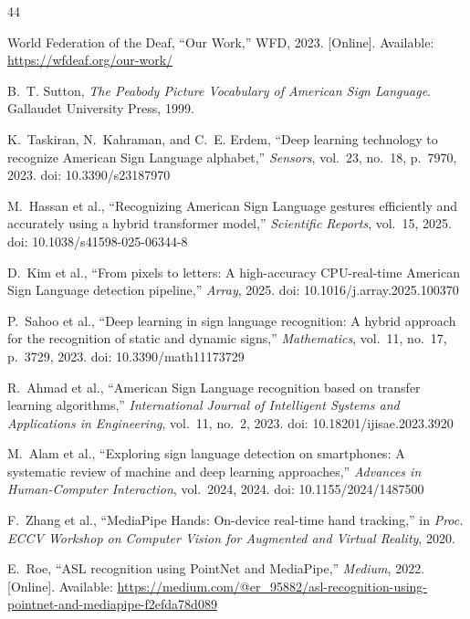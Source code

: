\documentclass[conference]{IEEEtran}
\begin{document}
\begin{thebibliography}{44}

World Federation of the Deaf, ``Our Work,'' WFD, 2023. [Online]. Available:
\url{https://wfdeaf.org/our-work/}

B.~T. Sutton, \textit{The Peabody Picture Vocabulary of American Sign Language}.
Gallaudet University Press, 1999.

K.~Taskiran, N.~Kahraman, and C.~E. Erdem, ``Deep learning technology to
recognize American Sign Language alphabet,'' \textit{Sensors}, vol.~23,
no.~18, p.~7970, 2023. doi: 10.3390/s23187970

M.~Hassan et al., ``Recognizing American Sign Language gestures efficiently and
accurately using a hybrid transformer model,'' \textit{Scientific Reports},
vol.~15, 2025. doi: 10.1038/s41598-025-06344-8

D.~Kim et al., ``From pixels to letters: A high-accuracy CPU-real-time American
Sign Language detection pipeline,'' \textit{Array}, 2025.
doi: 10.1016/j.array.2025.100370

P.~Sahoo et al., ``Deep learning in sign language recognition: A hybrid approach
for the recognition of static and dynamic signs,'' \textit{Mathematics},
vol.~11, no.~17, p.~3729, 2023. doi: 10.3390/math11173729

R.~Ahmad et al., ``American Sign Language recognition based on transfer learning
algorithms,'' \textit{International Journal of Intelligent Systems and
Applications in Engineering}, vol.~11, no.~2, 2023.
doi: 10.18201/ijisae.2023.3920

M.~Alam et al., ``Exploring sign language detection on smartphones: A systematic
review of machine and deep learning approaches,'' \textit{Advances in
Human-Computer Interaction}, vol.~2024, 2024. doi: 10.1155/2024/1487500

F.~Zhang et al., ``MediaPipe Hands: On-device real-time hand tracking,'' in
\textit{Proc. ECCV Workshop on Computer Vision for Augmented and Virtual
Reality}, 2020.

E.~Roe, ``ASL recognition using PointNet and MediaPipe,'' \textit{Medium},
2022. [Online]. Available:
\url{https://medium.com/@er_95882/asl-recognition-using-pointnet-and-mediapipe-f2efda78d089}


\end{thebibliography}
\end{document}
